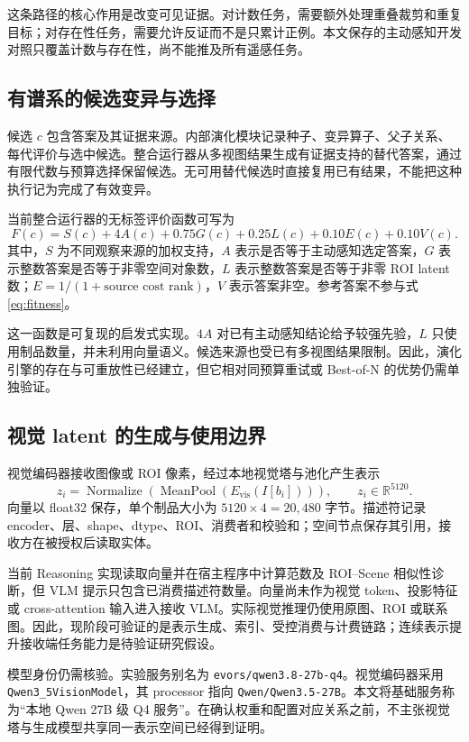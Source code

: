 \documentclass[UTF8,a4paper,zihao=5,fontset=fandol]{ctexart}
\newcommand{\code}[1]{\texttt{\small #1}}
\begin{document}
这条路径的核心作用是改变可见证据。对计数任务，需要额外处理重叠裁剪和重复目标；对存在性任务，需要允许反证而不是只累计正例。本文保存的主动感知开发对照只覆盖计数与存在性，尚不能推及所有遥感任务。

\subsection{有谱系的候选变异与选择}
候选 $c$ 包含答案及其证据来源。内部演化模块记录种子、变异算子、父子关系、每代评价与选中候选。整合运行器从多视图结果生成有证据支持的替代答案，通过有限代数与预算选择保留候选。无可用替代候选时直接复用已有结果，不能把这种执行记为完成了有效变异。

当前整合运行器的无标签评价函数可写为
\begin{equation}
 F(c)=S(c)+4A(c)+0.75G(c)+0.25L(c)+0.10E(c)+0.10V(c).
 \label{eq:fitness}
\end{equation}
其中，$S$ 为不同观察来源的加权支持，$A$ 表示是否等于主动感知选定答案，$G$ 表示整数答案是否等于非零空间对象数，$L$ 表示整数答案是否等于非零 ROI latent 数；$E=1/(1+\text{source cost rank})$，$V$ 表示答案非空。参考答案不参与式\eqref{eq:fitness}。

这一函数是可复现的启发式实现。$4A$ 对已有主动感知结论给予较强先验，$L$ 只使用制品数量，并未利用向量语义。候选来源也受已有多视图结果限制。因此，演化引擎的存在与可重放性已经建立，但它相对同预算重试或 Best-of-N 的优势仍需单独验证。

\subsection{视觉 latent 的生成与使用边界}
视觉编码器接收图像或 ROI 像素，经过本地视觉塔与池化产生表示
\begin{equation}
 z_i=\operatorname{Normalize}\!\left(\operatorname{MeanPool}(E_{\mathrm{vis}}(I[b_i]))\right),
 \qquad z_i\in\mathbb R^{5120}.
\end{equation}
向量以 float32 保存，单个制品大小为 $5120\times4=20{,}480$ 字节。描述符记录 encoder、层、shape、dtype、ROI、消费者和校验和；空间节点保存其引用，接收方在被授权后读取实体。

当前 Reasoning 实现读取向量并在宿主程序中计算范数及 ROI--Scene 相似性诊断，但 VLM 提示只包含已消费描述符数量。向量尚未作为视觉 token、投影特征或 cross-attention 输入进入接收 VLM。实际视觉推理仍使用原图、ROI 或联系图。因此，现阶段可验证的是表示生成、索引、受控消费与计费链路；连续表示提升接收端任务能力是待验证研究假设。

模型身份仍需核验。实验服务别名为 \code{evors/qwen3.8-27b-q4}。视觉编码器采用 \code{Qwen3\_5VisionModel}，其 processor 指向 \code{Qwen/Qwen3.5-27B}。本文将基础服务称为“本地 Qwen 27B 级 Q4 服务”。在确认权重和配置对应关系之前，不主张视觉塔与生成模型共享同一表示空间已经得到证明。
\end{document}
